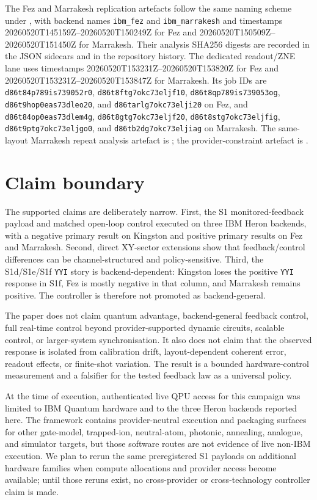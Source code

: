 \documentclass[preprint,aps,physrev,superscriptaddress,floatfix,longbibliography]{revtex4-2}
\begin{document}
The Fez and Marrakesh replication artefacts follow the same naming scheme
under , with backend names
\texttt{ibm\_fez} and \texttt{ibm\_marrakesh} and timestamps
20260520T145159Z--20260520T150249Z for Fez and
20260520T150509Z--20260520T151450Z for Marrakesh. Their analysis SHA256
digests are recorded in the JSON sidecars and in the repository history.
The dedicated readout/ZNE lane uses timestamps 20260520T153231Z--20260520T153820Z
for Fez and 20260520T153231Z--20260520T153847Z for Marrakesh. Its job IDs are
\texttt{d86t84p789is739052r0}, \texttt{d86t8ftg7okc73eljf10},
\texttt{d86t8qp789is739053og}, \texttt{d86t9hop0eas73dleo20}, and
\texttt{d86tarlg7okc73elji20} on Fez, and
\texttt{d86t84op0eas73dlem4g}, \texttt{d86t8gtg7okc73eljf20},
\texttt{d86t8stg7okc73eljfig}, \texttt{d86t9ptg7okc73eljgo0}, and
\texttt{d86tb2dg7okc73eljiag} on Marrakesh. The same-layout Marrakesh repeat
analysis artefact is
;
the provider-constraint artefact is
.

\section{Claim boundary}

The supported claims are deliberately narrow. First, the S1 monitored-feedback
payload and matched open-loop control executed on three IBM Heron backends,
with a negative primary result on Kingston and positive primary results on
Fez and Marrakesh. Second, direct XY-sector extensions show that
feedback/control differences can be channel-structured and policy-sensitive.
Third, the S1d/S1e/S1f \texttt{YYI} story is backend-dependent: Kingston loses
the positive \texttt{YYI} response in S1f, Fez is mostly negative in that
column, and Marrakesh remains positive. The controller is therefore not
promoted as backend-general.

The paper does not claim quantum advantage, backend-general feedback control,
full real-time control beyond provider-supported dynamic circuits, scalable
control, or larger-system synchronisation. It also does not claim that the
observed response is isolated from calibration drift, layout-dependent
coherent error, readout effects, or finite-shot variation. The result is a
bounded hardware-control measurement and a falsifier for the tested feedback
law as a universal policy.

At the time of execution, authenticated live QPU access for this campaign was
limited to IBM Quantum hardware and to the three Heron backends reported here.
The framework contains provider-neutral execution and packaging surfaces for
other gate-model, trapped-ion, neutral-atom, photonic, annealing, analogue, and
simulator targets, but those software routes are not evidence of live
non-IBM execution. We plan to rerun the same preregistered S1 payloads on
additional hardware families when compute allocations and provider access
become available; until those reruns exist, no cross-provider or
cross-technology controller claim is made.
\end{document}

